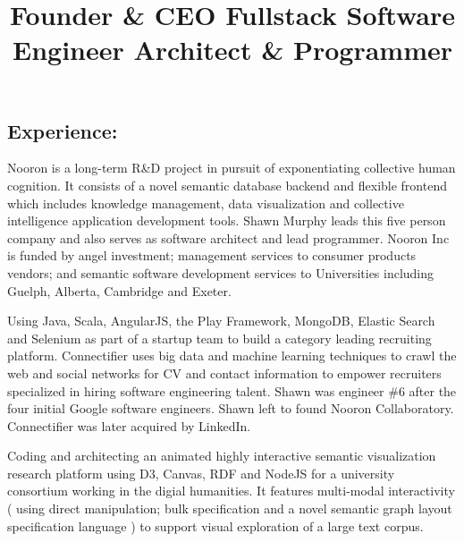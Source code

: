 \documentclass[line,margin,hidelinks]{res}
\begin{document}
\begin{resume}
\pagebreak
\section{Experience:}


\title{ Founder \& CEO }
\begin{position}
Nooron is a long-term R\&D project in pursuit of exponentiating
collective human cognition.  It consists of a novel semantic database
backend and flexible frontend which includes knowledge management,
data visualization and collective intelligence application development
tools.  Shawn Murphy leads this five person company and also serves as
software architect and lead programmer.  Nooron Inc is funded by
angel investment; management services to consumer products vendors;
and semantic software development services to Universities including
Guelph, Alberta, Cambridge and Exeter.
\end{position}

\title{ Fullstack Software Engineer }
\begin{position}
Using Java, Scala, AngularJS, the Play Framework, MongoDB, Elastic
Search and Selenium as part of a startup team to build a category
leading recruiting platform.  Connectifier uses big data and machine
learning techniques to crawl the web and social networks for CV and
contact information to empower recruiters specialized in hiring
software engineering talent.  Shawn was engineer \#6 after the four
initial Google software engineers.  Shawn left to found Nooron
Collaboratory.  Connectifier was later acquired by LinkedIn.
\end{position}

\title{ Architect \& Programmer }
\begin{position}
Coding and architecting an animated highly interactive semantic
visualization research platform using D3, Canvas, RDF and NodeJS for a
university consortium working in the digial humanities.  It features
multi-modal interactivity ( using direct manipulation; bulk
specification and a novel semantic graph layout specification language
) to support visual exploration of a large text corpus.
\end{position}


\end{resume}
\end{document}
